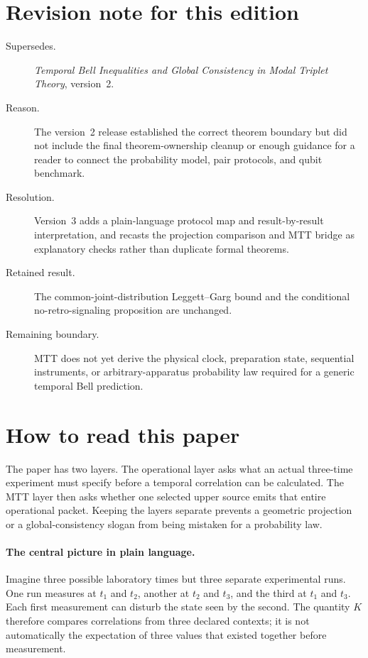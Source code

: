 \documentclass[11pt]{article}
\theoremstyle{definition}
\theoremstyle{remark}
\begin{document}
\section*{Revision note for this edition}
\begin{description}
\item[Supersedes.] \emph{Temporal Bell Inequalities and Global Consistency in
Modal Triplet Theory}, version~2.
\item[Reason.] The version~2 release established the correct theorem boundary
but did not include the final theorem-ownership cleanup or enough guidance
for a reader to connect the probability model, pair protocols, and qubit
benchmark.
\item[Resolution.] Version~3 adds a plain-language protocol map and
result-by-result interpretation, and recasts the projection comparison and
MTT bridge as explanatory checks rather than duplicate formal theorems.
\item[Retained result.] The common-joint-distribution Leggett--Garg bound and
the conditional no-retro-signaling proposition are unchanged.
\item[Remaining boundary.] MTT does not yet derive the physical clock,
preparation state, sequential instruments, or arbitrary-apparatus
probability law required for a generic temporal Bell prediction.
\end{description}

\section*{How to read this paper}
The paper has two layers.  The operational layer asks what an actual
three-time experiment must specify before a temporal correlation can be
calculated.  The MTT layer then asks whether one selected upper source emits
that entire operational packet.  Keeping the layers separate prevents a
geometric projection or a global-consistency slogan from being mistaken for
a probability law.

\paragraph{The central picture in plain language.}
Imagine three possible laboratory times but three separate experimental
runs.  One run measures at $t_1$ and $t_2$, another at $t_2$ and $t_3$, and
the third at $t_1$ and $t_3$.  Each first measurement can disturb the state
seen by the second.  The quantity $K$ therefore compares correlations from
three declared contexts; it is not automatically the expectation of three
values that existed together before measurement.
\end{document}
